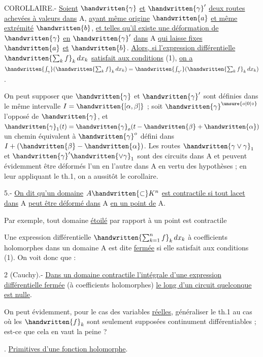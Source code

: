 COROLLAIRE.- \uline{Soient} $\handwritten{\gamma}$ \uline{et} $\handwritten{\gamma}'$ \uline{deux routes achevées à valeurs dans} A, \uline{ayant même origine} $\handwritten{a}$ \uline{et même extrémité} $\handwritten{b}$, \uline{et telles qu'il existe une déformation de} $\handwritten{\gamma}$ \uline{en} $\handwritten{\gamma}'$ \uline{dans} A \uline{qui laisse fixes} $\handwritten{a}$ \uline{et} $\handwritten{b}$. \uline{Alors, si l'expression différentielle} $\handwritten{\sum_k f}_k\,dx_k$ \uline{satisfait aux conditions} (1), \uline{on a} $\handwritten{\int_\gamma}(\handwritten{\sum_k f}_k\,dx_k)=\handwritten{\int_{\gamma'}}(\handwritten{\sum_k f}_k\,dx_k)$.

On peut supposer que $\handwritten{\gamma}$ et $\handwritten{\gamma}'$ sont définies dans le même intervalle $I=\handwritten{[\alpha,\beta]}$ ; soit $\handwritten{\gamma}^{\unsure{o|0|\circ}}$ l'opposé de $\handwritten{\gamma}$, et $\handwritten{\gamma}_1(t)=\handwritten{\gamma}_o(t-\handwritten{\beta}+\handwritten{\alpha})$ un chemin équivalent à $\handwritten{\gamma}^o$ défini dans $I+(\handwritten{\beta}-\handwritten{\alpha})$. Les routes $\handwritten{\gamma\vee\gamma}_1$ et $\handwritten{\gamma}'\handwritten{\vee\gamma}_1$ sont des circuits dans A et peuvent évidemment être déformés l'un en l'autre dans A en vertu des hypothèses ; en leur appliquant le th.1, on a aussitôt le corollaire.

 5.- \uline{On dit qu'un domaine} $A\handwritten{\subset}K^n$ \uline{est contractile si tout lacet dans} A \uline{peut être déformé dans} A \uline{en un point de} A.

Par exemple, tout domaine \uline{étoilé} par rapport à un point est contractile

Une expression différentielle $\handwritten{\sum_{k=1}^n f}_k\,dx_k$ à coefficients holomorphes dans un domaine A est dite \uline{fermée} si elle satisfait aux conditions (1). On voit donc que :

 2 (Cauchy).- \uline{Dans un domaine contractile l'intégrale d'une expression différentielle fermée} (à coefficients holomorphes) \uline{le long d'un circuit quelconque est nulle}.

On peut évidemment, pour le cas des variables \uline{réelles}, généraliser le th.1 au cas où les $\handwritten{f}_k$ sont seulement supposées continument différentiables ; est-ce que cela en vaut la peine ?

. \uline{Primitives d'une fonction holomorphe}.

